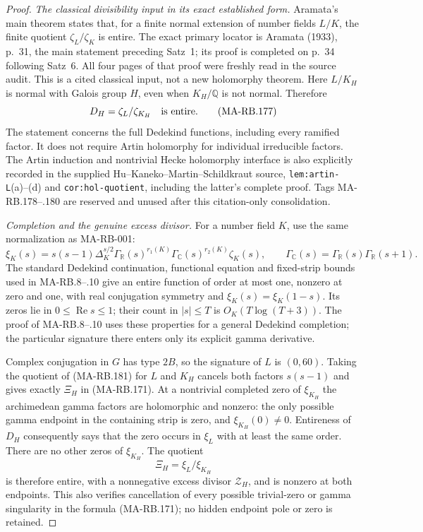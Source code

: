 \begin{proof}
\emph{The classical divisibility input in its exact established form.}
Aramata's main theorem states that, for a finite normal
extension of number fields \(L/K\), the finite quotient
\(\zeta_L/\zeta_K\) is entire. The exact primary locator
is Aramata (1933), p.~31, the main statement preceding
Satz~1; its proof is completed on p.~34 following
Satz~6. All four pages of that proof were freshly
read in the source audit. This is a cited classical
input, not a new holomorphy theorem.
Here \(L/K_H\) is normal with Galois group \(H\),
even when \(K_H/\mathbb Q\) is not normal. Therefore
\[
             D_H=\zeta_L/\zeta_{K_H}\quad\hbox{is entire}.
 \tag{MA-RB.177}
\]
The statement concerns the full Dedekind functions,
including every ramified factor. It does not require
Artin holomorphy for individual irreducible factors.
The Artin induction and nontrivial Hecke holomorphy
interface is also explicitly recorded in the supplied
Hu--Kaneko--Martin--Schildkraut source,
\texttt{lem:artin-L}(a)--(d) and
\texttt{cor:hol-quotient}, including the latter's
complete proof. Tags MA-RB.178--.180 are reserved
and unused after this citation-only consolidation.

\emph{Completion and the genuine excess divisor.}
For a number field \(K\), use the same normalization
as MA-RB-001:
\[
 \xi_K(s)=s(s-1)\Delta_K^{s/2}
      \Gamma_{\mathbb R}(s)^{r_1(K)}
      \Gamma_{\mathbb C}(s)^{r_2(K)}\zeta_K(s),
 \qquad
 \Gamma_{\mathbb C}(s)
       =\Gamma_{\mathbb R}(s)\Gamma_{\mathbb R}(s+1).
 \tag{MA-RB.181}
\]
The standard Dedekind continuation, functional
equation and fixed-strip bounds used in MA-RB.8--.10
give an entire function of order at most one,
nonzero at zero and one, with real conjugation
symmetry and \(\xi_K(s)=\xi_K(1-s)\).
Its zeros lie in \(0\le\operatorname{Re}s\le1\);
their count in \(|s|\le T\) is \(O_K(T\log(T+3))\).
The proof of MA-RB.8--.10 uses these properties
for a general Dedekind completion; the particular
signature there enters only its explicit gamma
derivative.

Complex conjugation in \(G\) has type \(2B\), so
the signature of \(L\) is \((0,60)\).
Taking the quotient of (MA-RB.181) for \(L\) and
\(K_H\) cancels both factors \(s(s-1)\) and gives
exactly \(\Xi_H\) in (MA-RB.171).
At a nontrivial completed zero of \(\xi_{K_H}\)
the archimedean gamma factors are holomorphic and
nonzero: the only possible gamma endpoint in
the containing strip is zero, and \(\xi_{K_H}(0)\ne0\).
Entireness of \(D_H\) consequently says that
the zero occurs in \(\xi_L\) with at least the
same order. There are no other zeros of
\(\xi_{K_H}\). The quotient
\[
                   \Xi_H=\xi_L/\xi_{K_H}
 \tag{MA-RB.182}
\]
is therefore entire, with a nonnegative excess
divisor \(\mathcal Z_H\), and is nonzero at both
endpoints. This also verifies cancellation of
every possible trivial-zero or gamma singularity
in the formula (MA-RB.171); no hidden endpoint
pole or zero is retained.


\end{proof}
